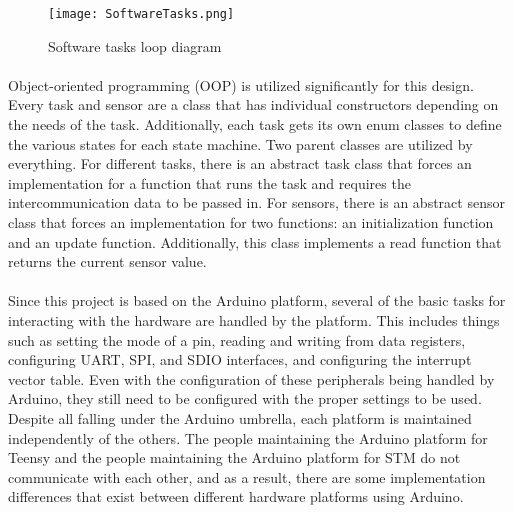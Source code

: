 \begin{figure}[H]
	\centering
	\texttt{[image: SoftwareTasks.png]}
	\caption{Software tasks loop diagram}
	\label{fig:SoftwareTasks}
\end{figure}

\paragraph{}
Object-oriented programming (OOP) is utilized significantly for this design.
Every task and sensor are a class that has individual constructors depending on the needs of the task.
Additionally, each task gets its own enum classes to define the various states for each state machine.
Two parent classes are utilized by everything.
For different tasks, there is an abstract task class that forces an implementation for a function that runs the task and requires the intercommunication data to be passed in.
For sensors, there is an abstract sensor class that forces an implementation for two functions: an initialization function and an update function.
Additionally, this class implements a read function that returns the current sensor value.

\paragraph{}
Since this project is based on the Arduino platform, several of the basic tasks for interacting with the hardware are handled by the platform.
This includes things such as setting the mode of a pin, reading and writing from data registers, configuring UART, SPI, and SDIO interfaces, and configuring the interrupt vector table.
Even with the configuration of these peripherals being handled by Arduino, they still need to be configured with the proper settings to be used.
Despite all falling under the Arduino umbrella, each platform is maintained independently of the others.
The people maintaining the Arduino platform for Teensy and the people maintaining the Arduino platform for STM do not communicate with each other, and as a result, there are some implementation differences that exist between different hardware platforms using Arduino.

